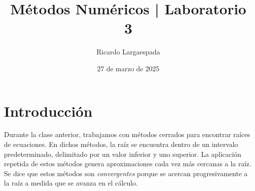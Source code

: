 \documentclass[12pt,letterpaper]{article}
\author{Ricardo Largaespada}
\title{\textbf{Métodos Numéricos | Laboratorio 3}}
\date{27 de marzo de 2025}
\theoremstyle{definition}
\theoremstyle{plain}
\theoremstyle{remark}
\begin{document}
\maketitle


\section{Introducción}
Durante la clase anterior, trabajamos con métodos cerrados para encontrar raíces de ecuaciones. En dichos métodos, la raíz se encuentra dentro de un intervalo predeterminado, delimitado por un valor inferior y uno superior. La aplicación repetida de estos métodos genera aproximaciones cada vez más cercanas a la raíz. Se dice que estos métodos son {\it convergentes} porque se acercan progresivamente a la raíz a medida que se avanza en el cálculo.\\
\end{document}

